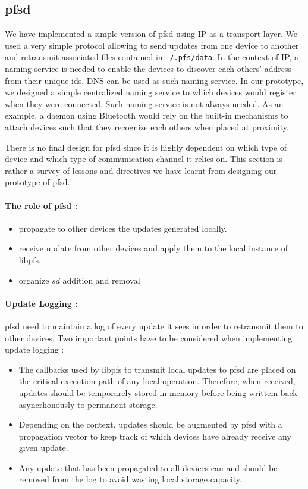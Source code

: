 \subsection {pfsd}

We have implemented a simple version of pfsd using IP as a transport
layer. We used a very simple protocol allowing to send updates from
one device to another and retransmit associated files contained in {\tt
  /.pfs/data}. In the context of IP, a naming service is needed to
enable the devices to discover each others' address from
their unique ids. DNS can be used as such naming service. In our
prototype, we designed a simple centralized naming service to which
devices would register when they were connected. Such naming service
is not always needed. As an example, a daemon using Bluetooth
would rely on the built-in mechanisms to attach devices such that they
recognize each others when placed at proximity.

There is no final design for pfsd since it is highly dependent on which
type of device and which type of communication channel it relies on. This
section is rather a survey of lessons and directives we have learnt
from designing our prototype of pfsd. 

\paragraph {The role of pfsd :}
\begin{itemize}
\item propagate to other devices the updates generated locally.
\item receive update from other devices and apply them to the local
  instance of libpfs.
\item organize $sd$ addition and removal
\end{itemize}

\paragraph {Update Logging :}
pfsd need to maintain a log of every update it sees in order to
retransmit them to other devices. Two important points have to be
considered when implementing update logging :
\begin{itemize}
\item The callbacks used by libpfs to transmit local updates to pfsd are
  placed on the critical execution path of any local
  operation. Therefore, when received, updates should be temporarely
  stored in memory before being writtem back asyncrhonously to permanent
  storage.
\item Depending on the context, updates should be augmented by pfsd
  with a propagation vector to keep track of which devices have
  already receive any given update.
\item Any update that has been propagated to all devices can and
  should be removed from the log to avoid wasting local storage
  capacity.
\end{itemize}

